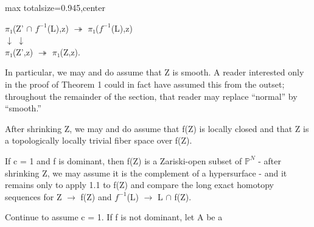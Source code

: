 \documentclass[10pt,a4paper]{article}
\begin{document}
\begin{adjustbox}{max totalsize={\textwidth}{0.945\textheight},center}
\begin{minipage}{\textwidth}
\noindent \ensuremath{π₁}(Z' \ensuremath{∩} \ensuremath{f^{-1}}(L),z)  \ensuremath{↠}  \ensuremath{π₁}(\ensuremath{f^{-1}}(L),z)\\          \ensuremath{↓}                         \ensuremath{↓}\\\ensuremath{π₁}(Z',z)              \ensuremath{↠}  \ensuremath{π₁}(Z,z).\par\smallskip
\noindent In particular, we may and do assume that Z is smooth. A reader interested only in the proof of Theorem 1 could in fact have assumed this from the outset; throughout the remainder of the section, that reader may replace “normal” by “smooth.”\par\smallskip
\noindent After shrinking Z, we may and do assume that f(Z) is locally closed and that Z is a topologically locally trivial fiber space over f(Z).\par\smallskip
\noindent If c = 1 and f is dominant, then f(Z) is a Zariski-open subset of \ensuremath{ℙ^N} - after shrinking Z, we may assume it is the complement of a hypersurface - and it remains only to apply 1.1 to f(Z) and compare the long exact homotopy sequences for Z \ensuremath{→} f(Z) and \ensuremath{f^{-1}}(L) \ensuremath{→} L \ensuremath{∩} f(Z).\par\smallskip
\noindent Continue to assume c = 1. If f is not dominant, let A be a\par\smallskip
\end{minipage}
\end{adjustbox}
\newpage
\end{document}
